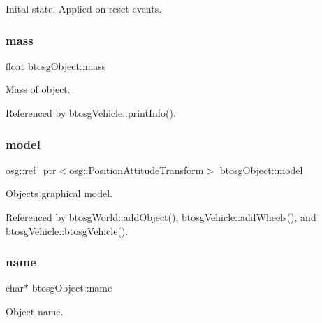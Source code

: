 Inital state. Applied on reset events. 

\mbox{\label{classbtosgObject_a2418bb2194d5e9b0f1c51c84672ba7d1}} 
\subsubsection{\texorpdfstring{mass}{mass}}
{\footnotesize\ttfamily float btosg\+Object\+::mass\hspace{0.3cm}{\ttfamily [inherited]}}



Mass of object. 



Referenced by btosg\+Vehicle\+::print\+Info().

\mbox{\label{classbtosgObject_afd15726e7a214212d6d5815f8ac1ac6c}} 
\subsubsection{\texorpdfstring{model}{model}}
{\footnotesize\ttfamily osg\+::ref\+\_\+ptr$<$osg\+::\+Position\+Attitude\+Transform$>$ btosg\+Object\+::model\hspace{0.3cm}{\ttfamily [inherited]}}



Object\textquotesingle{}s graphical model. 



Referenced by btosg\+World\+::add\+Object(), btosg\+Vehicle\+::add\+Wheels(), and btosg\+Vehicle\+::btosg\+Vehicle().

\mbox{\label{classbtosgObject_a12396e1362797a75473a2e833b579cc9}} 
\subsubsection{\texorpdfstring{name}{name}}
{\footnotesize\ttfamily char$\ast$ btosg\+Object\+::name\hspace{0.3cm}{\ttfamily [inherited]}}



Object name. 



